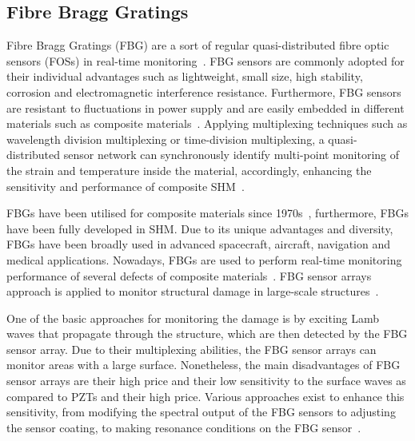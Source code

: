 \subsection{Fibre Bragg Gratings} 
Fibre Bragg Gratings (FBG) are a sort of regular quasi-distributed fibre optic sensors (FOSs) in real-time monitoring~\cite{Cai2012}.  
FBG sensors are commonly adopted for their individual advantages such as lightweight, small size, high stability, corrosion and electromagnetic interference resistance. 
Furthermore, FBG sensors are resistant to fluctuations in power supply and are easily embedded in different materials such as composite materials~\cite{Jang2012}. 
Applying multiplexing techniques such as wavelength division multiplexing or time-division multiplexing, a quasi-distributed sensor network can synchronously identify multi-point monitoring of the strain and temperature inside the material, accordingly, enhancing the sensitivity and performance of composite SHM~\cite{Jang2012}.

FBGs have been utilised for composite materials since 1970s~\cite{othonos1999fiber}, furthermore, FBGs have been fully developed in SHM. 
Due to its unique advantages and diversity, FBGs have been broadly used in advanced spacecraft, aircraft, navigation and medical applications. 
Nowadays, FBGs are used to perform real-time monitoring performance of several defects of composite materials~\cite{rezayat2016reconstruction}.
FBG sensor arrays approach is applied to monitor structural damage in large-scale structures~\cite{Wee2017}.

One of the basic approaches for monitoring the damage is by exciting Lamb waves that propagate through the structure, which are then detected by the FBG sensor array. 
Due to their multiplexing abilities, the FBG sensor arrays can monitor areas with a large surface. 
Nonetheless, the main disadvantages of FBG sensor arrays are their high price and their low sensitivity to the surface waves as compared to PZTs and their high price. 
Various approaches exist to enhance this sensitivity, from modifying the spectral output of the FBG sensors to adjusting the sensor coating, to making resonance conditions on the FBG sensor~\cite{Wee2017}.
